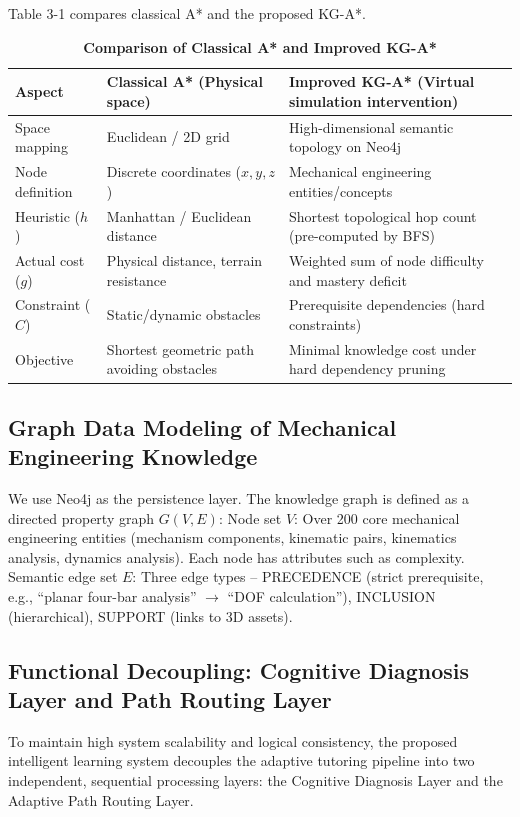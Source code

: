 \documentclass{ieeeaccess}
\begin{document}
Table 3-1 compares classical A* and the proposed KG-A*.

\begin{table}[t]
\setlength{\belowcaptionskip}{0pt}
\caption{\textbf{Comparison of Classical A* and Improved KG-A*}}
\label{table3-1}
\setlength{\tabcolsep}{3pt}
\small  %
\begin{tabularx}{\linewidth}{|>{\raggedright\arraybackslash}X|>{\raggedright\arraybackslash}X|>{\raggedright\arraybackslash}X|}
\hline
\textbf{Aspect} & \textbf{Classical A* (Physical space)} & \textbf{Improved KG-A* (Virtual simulation intervention)} \\
\hline
Space mapping & Euclidean / 2D grid & High-dimensional semantic topology on Neo4j \\
Node definition & Discrete coordinates ($x,y,z$) & Mechanical engineering entities/concepts \\
Heuristic ($h$) & Manhattan / Euclidean distance & Shortest topological hop count (pre-computed by BFS) \\
Actual cost ($g$) & Physical distance, terrain resistance & Weighted sum of node difficulty and mastery deficit \\
Constraint ($C$) & Static/dynamic obstacles & Prerequisite dependencies (hard constraints) \\
Objective & Shortest geometric path avoiding obstacles & Minimal knowledge cost under hard dependency pruning \\
\hline
\end{tabularx}
\end{table}

\subsection{Graph Data Modeling of Mechanical Engineering Knowledge}
We use Neo4j as the persistence layer. The knowledge graph is defined as a directed property graph $G(V,E)$:
Node set $V$: Over 200 core mechanical engineering entities (mechanism components, kinematic pairs, kinematics analysis, dynamics analysis). Each node has attributes such as complexity.
Semantic edge set $E$: Three edge types – PRECEDENCE (strict prerequisite, e.g., ``planar four-bar analysis'' $\rightarrow$ ``DOF calculation''), INCLUSION (hierarchical), SUPPORT (links to 3D assets).

\subsection{Functional Decoupling: Cognitive Diagnosis Layer and Path Routing Layer}
To maintain high system scalability and logical consistency, the proposed intelligent learning system decouples the adaptive tutoring pipeline into two independent, sequential processing layers: the Cognitive Diagnosis Layer and the Adaptive Path Routing Layer.
\end{document}

